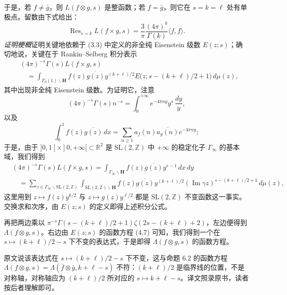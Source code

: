 于是，若 $f\ne\bar g$，则 $L(f\otimes g,s)$ 是整函数；若 $f=\bar g$，则它在 $s=k=\ell$ 处有单极点。留数由下式给出：
\[
\operatorname{Res}_{s=k}L(f\times g,s)=\frac{3}{\pi}\frac{(4\pi)^{k}}{\Gamma(k)}\langle f,f\rangle.
\]
\emph{证明梗概}\quad 证明关键地依赖于 (3.3) 中定义的非全纯 Eisenstein 级数 $E(z;s)$；确切地说，关键在于 Rankin--Selberg 积分表示
\begin{align*}
&(4\pi)^{-s}\Gamma(s)L(f\times g,s)\\
&\quad=\int_{\Gamma_{0}(1)\backslash\mathbf{H}}f(z)\overline{g(z)}y^{(k+\ell)/2}E\bigl(z;s-(k+\ell)/2+1\bigr)\,d\mu(z),
\end{align*}
其中出现非全纯 Eisenstein 级数。为证明它，注意
\[
(4\pi)^{-s}\Gamma(s)n^{-s}=\int_{0}^{+\infty}e^{-4\pi ny}y^{s}\,\frac{dy}{y},
\]
以及
\[
\int_{0}^{1}f(z)\overline{g(z)}\,dx=\sum_{n\ge1}a_{f}(n)\overline{a_{g}(n)}e^{-4\pi ny};
\]
于是，由于 $]0,1[\times]0,+\infty[\subset\mathbb{R}^{2}$ 是 $\mathrm{SL}(2,\mathbb{Z})$ 中 $+\infty$ 的稳定化子 $\Gamma_{\infty}$ 的基本域，我们得到
\begin{align*}
&(4\pi)^{-s}\Gamma(s)L(f\times g,s)=\int_{\Gamma_{\infty}\backslash\mathbf{H}}f(z)\overline{g(z)}y^{s-1}\,dx\,dy\\
&\quad=\sum_{\gamma\in\Gamma_{\infty}\backslash\mathrm{SL}(2,\mathbb{Z})}\int_{\mathrm{SL}(2,\mathbb{Z})\backslash\mathbf{H}}f(z)\overline{g(z)}y^{(k+\ell)/2}(\operatorname{Im}\gamma z)^{s-(k+\ell)/2+1}\,d\mu(z),
\end{align*}
这里用到 $z\mapsto f(z)y^{k/2}$ 与 $z\mapsto g(z)y^{\ell/2}$ 都是 $\mathrm{SL}(2,\mathbb{Z})$ 不变函数这一事实。交换求和次序，由 $E(z;s)$ 的定义即得上述积分公式。

再把两边乘以 $\pi^{-s}\Gamma(s-(k+\ell)/2+1)\zeta(2s-(k+\ell)+2)$，左边便得到 $\Lambda(f\otimes g,s)$。右边由 $E(z;s)$ 的函数方程 (4.7) 可知，我们得到一个在 $s\mapsto(k+\ell)/2-s$ 下不变的表达式，于是即得 $\Lambda(f\otimes g,s)$ 的函数方程。

\begin{annote}
原文说该表达式在 $s\mapsto(k+\ell)/2-s$ 下不变，这与命题 6.2 的函数方程 $\Lambda(f\otimes g,s)=\Lambda(\bar f\otimes\bar g,k+\ell-s)$ 不符：$(k+\ell)/2$ 是临界线的位置，不是对称轴，对称轴应为 $(k+\ell)/2$ 所对应的 $s\mapsto k+\ell-s$。译文照录原书，读者按后者理解即可。
\par\vspace{0.15em}{\raggedleft 【来源：原书 §6.2（A）】\par}
\end{annote}

